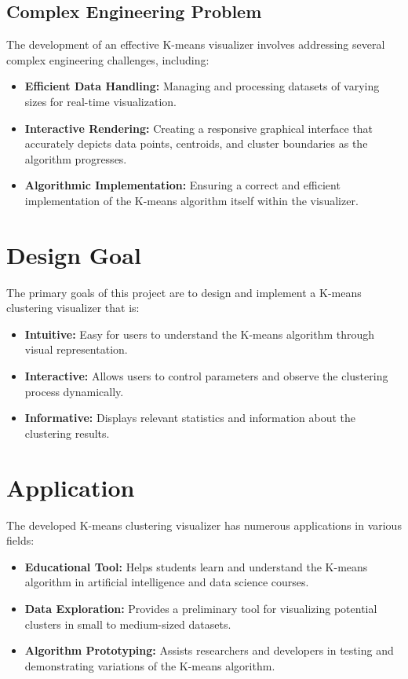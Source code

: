 \documentclass[12pt]{report}
\begin{document}
\subsection{Complex Engineering Problem}
The development of an effective K-means visualizer involves addressing several complex engineering challenges, including:
\begin{itemize}
    \item \textbf{Efficient Data Handling:} Managing and processing datasets of varying sizes for real-time visualization.
    \item \textbf{Interactive Rendering:} Creating a responsive graphical interface that accurately depicts data points, centroids, and cluster boundaries as the algorithm progresses.
    \item \textbf{Algorithmic Implementation:} Ensuring a correct and efficient implementation of the K-means algorithm itself within the visualizer.
\end{itemize}

\section{Design Goal}
The primary goals of this project are to design and implement a K-means clustering visualizer that is:
\begin{itemize}
    \item \textbf{Intuitive:} Easy for users to understand the K-means algorithm through visual representation.
    \item \textbf{Interactive:} Allows users to control parameters and observe the clustering process dynamically.
    \item \textbf{Informative:} Displays relevant statistics and information about the clustering results.
\end{itemize}

\section{Application}
The developed K-means clustering visualizer has numerous applications in various fields:
\begin{itemize}
    \item \textbf{Educational Tool:} Helps students learn and understand the K-means algorithm in artificial intelligence and data science courses.
    \item \textbf{Data Exploration:} Provides a preliminary tool for visualizing potential clusters in small to medium-sized datasets.
    \item \textbf{Algorithm Prototyping:} Assists researchers and developers in testing and demonstrating variations of the K-means algorithm.
\end{itemize}
\end{document}
